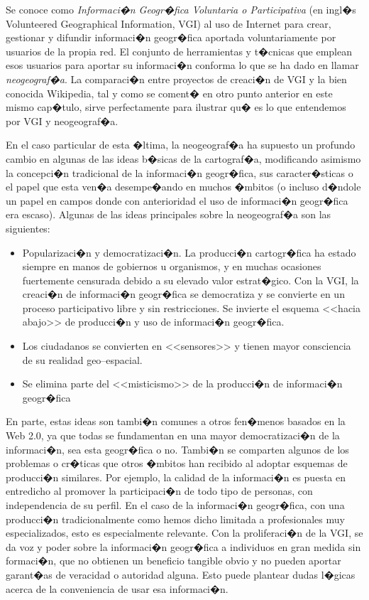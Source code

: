 Se conoce como \emph{Informaci�n Geogr�fica Voluntaria o Participativa} (en ingl�s Volunteered Geographical Information, VGI)\cite{Goodchild2007VGI} al uso de Internet para crear, gestionar y difundir informaci�n geogr�fica aportada voluntariamente por usuarios de la propia red. El conjunto de herramientas y t�cnicas que emplean esos usuarios para aportar su informaci�n conforma lo que se ha dado en llamar \emph{neogeograf�a}. La comparaci�n entre proyectos de creaci�n de VGI y la bien conocida Wikipedia, tal y como se coment� en otro punto anterior en este mismo cap�tulo, sirve perfectamente para ilustrar qu� es lo que entendemos por VGI y neogeograf�a.

En el caso particular de esta �ltima, la neogeograf�a ha supuesto un profundo cambio en algunas de las ideas b�sicas de la cartograf�a, modificando asimismo la concepci�n tradicional de la informaci�n geogr�fica, sus caracter�sticas o el papel que esta ven�a desempe�ando en muchos �mbitos (o incluso d�ndole un papel en campos donde con anterioridad el uso de informaci�n geogr�fica era escaso). Algunas de las ideas principales sobre la neogeograf�a son las siguientes:

\begin{itemize}
	\item Popularizaci�n y democratizaci�n. La producci�n cartogr�fica ha estado siempre en manos de gobiernos u organismos, y en muchas ocasiones fuertemente censurada debido a su elevado valor estrat�gico. Con la VGI, la creaci�n de informaci�n geogr�fica se democratiza y se convierte en un proceso participativo libre y sin restricciones.  Se invierte el esquema <<hacia abajo>> de producci�n y uso de informaci�n geogr�fica.
	\item Los ciudadanos se convierten en <<sensores>> y tienen mayor consciencia de su realidad geo--espacial.
	\item Se elimina parte del <<misticismo>> de la producci�n de informaci�n geogr�fica	
\end{itemize}

En parte, estas ideas son tambi�n comunes a otros fen�menos basados en la Web 2.0, ya que todas se fundamentan en una mayor democratizaci�n de la informaci�n, sea esta geogr�fica o no. Tambi�n se comparten algunos de los problemas o cr�ticas que otros �mbitos han recibido al adoptar esquemas de producci�n similares. Por ejemplo, la calidad de la informaci�n es puesta en entredicho al promover la participaci�n de todo tipo de personas, con independencia de su perfil. En el caso de la informaci�n geogr�fica, con una producci�n tradicionalmente como hemos dicho limitada a profesionales muy especializados, esto es especialmente relevante. Con la proliferaci�n de la VGI, se da voz y poder sobre la informaci�n geogr�fica a individuos en gran medida sin formaci�n, que no obtienen un beneficio tangible obvio y no pueden aportar garant�as de veracidad o autoridad alguna. Esto puede plantear dudas l�gicas acerca de la conveniencia de usar esa informaci�n.

